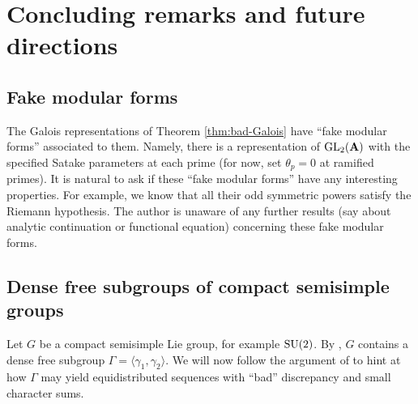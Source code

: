 
\chapter{Concluding remarks and future directions}





\section{Fake modular forms}

The Galois representations of Theorem \ref{thm:bad-Galois} have ``fake modular 
forms'' associated to them. Namely, there is a representation of $\operatorname{GL}_2(\mathbf{A})$ 
with the specified Satake parameters at each prime (for now, set $\theta_p = 0$ 
at ramified primes). It is natural to ask if these ``fake modular forms'' have 
any interesting properties. For example, we know that all their odd symmetric 
powers satisfy the Riemann hypothesis. The author is unaware of any further 
results (say about analytic continuation or functional equation) concerning 
these fake modular forms. 





\section{Dense free subgroups of compact semisimple groups}

Let $G$ be a compact semisimple Lie group, for example $\operatorname{SU}(2)$. By 
\cite{breuillard-gelander-2003}, $G$ contains a dense free subgroup 
$\Gamma = \langle \gamma_1,\gamma_2\rangle$. We will now follow the argument of 
\cite{arnold-krylov-1963} to hint at how $\Gamma$ may yield equidistributed 
sequences with ``bad'' discrepancy and small character sums. 

